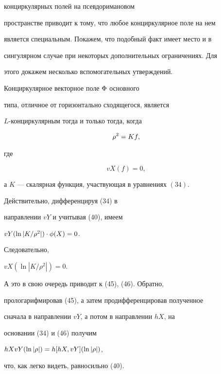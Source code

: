 конциркулярных полей на псевдоримановом


пространстве приводит к тому, что любое конциркулярное поле на нем


является специальным. Покажем, что подобный факт имеет место и в


сингулярном случае при некоторых дополнительных ограничениях. Для


этого докажем несколько вспомогательных утверждений.





\begin{lem}


Конциркулярное векторное поле $\Phi$ основного


типа, отличное от горизонтально сходящегося, является


$L$-конциркулярным тогда и только тогда, когда


\begin{equation}


\ro^2=Kf,


\end{equation}


где


\begin{equation}


vX(f)=0,


\end{equation}


а $K$ --- скалярная функция, участвующая в уравнениях $(34)$.


\end{lem}





\begin{pf}


Действительно, дифференцируя (34) в


направлении $vY$ и учитывая (40), имеем


${vY}(\ln{| {K}/{\rho }^2|})\cdot\phi(X)=0$.


Следовательно,


${vX}(\ln{| {K}/{\rho }^2|})=0$.


А это в свою очередь приводит к (45), (46). Обратно,


прологарифмировав (45), а затем продифференцировав полученное


сначала в направлении $vY$, а потом в направлении $hX$, на


основании (34) и (46) получим


$hXvY(\ln{|\rho|})=h[hX,vY](\ln{|\rho|})$,


что, как легко видеть, равносильно (40).


\end{pf}





